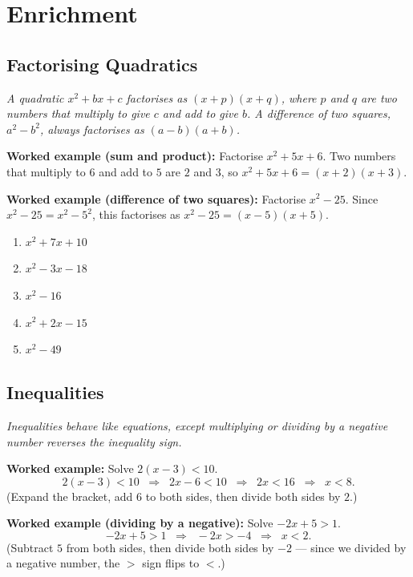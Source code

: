 \documentclass[11pt]{article}
\newcommand{\ans}{\hrulefill}
\newcommand{\anshere}{\par\vspace{0.2em}\noindent\ans\par\vspace{0.2em}}
\begin{document}
\section*{Enrichment}

\subsection*{Factorising Quadratics}
\noindent\textit{A quadratic $x^2+bx+c$ factorises as $(x+p)(x+q)$, where $p$ and $q$ are
two numbers that \emph{multiply} to give $c$ and \emph{add} to give $b$. A difference of
two squares, $a^2-b^2$, always factorises as $(a-b)(a+b)$.}

\vspace{0.4em}
\noindent\textbf{Worked example (sum and product):} Factorise $x^2+5x+6$. Two numbers that
multiply to $6$ and add to $5$ are $2$ and $3$, so $x^2+5x+6=(x+2)(x+3)$.

\vspace{0.4em}
\noindent\textbf{Worked example (difference of two squares):} Factorise $x^2-25$. Since
$x^2-25 = x^2-5^2$, this factorises as $x^2-25=(x-5)(x+5)$.

\vspace{0.4em}
\begin{enumerate}[label=(\alph*)]
  \item $x^2+7x+10$
  \anshere
  \item $x^2-3x-18$
  \anshere
  \item $x^2-16$
  \anshere
  \item $x^2+2x-15$
  \anshere
  \item $x^2-49$
  \anshere
\end{enumerate}

\subsection*{Inequalities}
\noindent\textit{Inequalities behave like equations, except multiplying or dividing by
a negative number reverses the inequality sign.}

\vspace{0.4em}
\noindent\textbf{Worked example:} Solve $2(x-3) < 10$.
\[2(x-3) < 10 \;\;\Rightarrow\;\; 2x-6 < 10 \;\;\Rightarrow\;\; 2x < 16 \;\;\Rightarrow\;\; x < 8.\]
(Expand the bracket, add $6$ to both sides, then divide both sides by $2$.)

\vspace{0.4em}
\noindent\textbf{Worked example (dividing by a negative):} Solve $-2x+5 > 1$.
\[-2x+5 > 1 \;\;\Rightarrow\;\; -2x > -4 \;\;\Rightarrow\;\; x < 2.\]
(Subtract $5$ from both sides, then divide both sides by $-2$ --- since we divided by a
negative number, the $>$ sign flips to $<$.)
\end{document}

